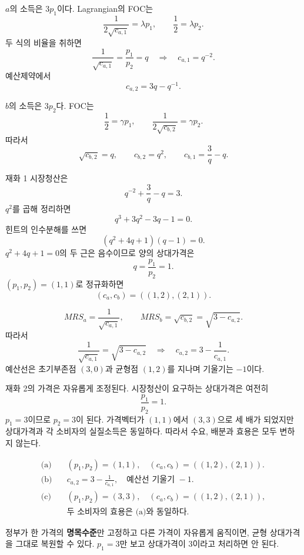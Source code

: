\begin{solutionbox}
$a$의 소득은 $3p_1$이다. Lagrangian의 FOC는
\[
\frac1{2\sqrt{c_{a,1}}}=\lambda p_1,
\qquad
\frac12=\lambda p_2.
\]
두 식의 비율을 취하면
\[
\frac1{\sqrt{c_{a,1}}}=\frac{p_1}{p_2}=q
\quad\Longrightarrow\quad c_{a,1}=q^{-2}.
\]
예산제약에서
\[
c_{a,2}=3q-q^{-1}.
\]

$b$의 소득은 $3p_2$다. FOC는
\[
\frac12=\gamma p_1,
\qquad
\frac1{2\sqrt{c_{b,2}}}=\gamma p_2.
\]
따라서
\[
\sqrt{c_{b,2}}=q,\qquad c_{b,2}=q^2,\qquad
c_{b,1}=\frac3q-q.
\]

재화 1 시장청산은
\[
q^{-2}+\frac3q-q=3.
\]
$q^2$를 곱해 정리하면
\[
q^3+3q^2-3q-1=0.
\]
힌트의 인수분해를 쓰면
\[
(q^2+4q+1)(q-1)=0.
\]
$q^2+4q+1=0$의 두 근은 음수이므로 양의 상대가격은
\[
\boxed{q=\frac{p_1}{p_2}=1}.
\]
$(p_1,p_2)=(1,1)$로 정규화하면
\[
(c_a,c_b)=((1,2),(2,1)).
\]

\[
MRS_a=\frac{1}{\sqrt{c_{a,1}}},
\qquad
MRS_b=\sqrt{c_{b,2}}=\sqrt{3-c_{a,2}}.
\]
따라서
\[
\frac1{\sqrt{c_{a,1}}}=\sqrt{3-c_{a,2}}
\quad\Longrightarrow\quad
\boxed{c_{a,2}=3-\frac1{c_{a,1}}}.
\]
예산선은 초기부존점 $(3,0)$과 균형점 $(1,2)$를 지나며 기울기는 $-1$이다.

재화 2의 가격은 자유롭게 조정된다. 시장청산이 요구하는 상대가격은 여전히
\[
\frac{p_1}{p_2}=1.
\]
$p_1=3$이므로 $p_2=3$이 된다. 가격벡터가 $(1,1)$에서 $(3,3)$으로 세 배가 되었지만 상대가격과 각 소비자의 실질소득은 동일하다. 따라서 수요, 배분과 효용은 모두 변하지 않는다.
\end{solutionbox}

\begin{answerbox}
\begin{align*}
\text{(a)}\quad &(p_1,p_2)=(1,1),\quad(c_a,c_b)=((1,2),(2,1)).\\
\text{(b)}\quad &c_{a,2}=3-\frac1{c_{a,1}},\quad\text{예산선 기울기 }-1.\\
\text{(c)}\quad &(p_1,p_2)=(3,3),\quad(c_a,c_b)=((1,2),(2,1)),\\
&\text{두 소비자의 효용은 (a)와 동일하다.}
\end{align*}
\end{answerbox}

\begin{warningbox}
정부가 한 가격의 \textbf{명목수준}만 고정하고 다른 가격이 자유롭게 움직이면, 균형 상대가격을 그대로 복원할 수 있다. $p_1=3$만 보고 상대가격이 3이라고 처리하면 안 된다.
\end{warningbox}
